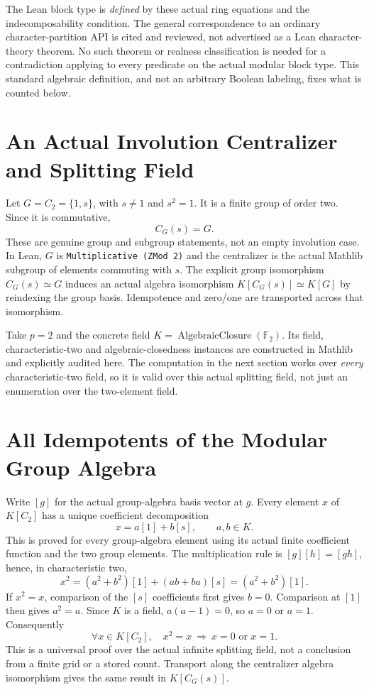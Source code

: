\documentclass[11pt]{article}
\newcommand{\F}{\mathbb F}
\begin{document}
The Lean block type is \emph{defined} by these actual ring equations and
the indecomposability condition. The general correspondence to an ordinary
character-partition API is cited and reviewed, not advertised as a Lean
character-theory theorem. No such theorem or realness classification is
needed for a contradiction applying to every predicate on the actual
modular block type. This standard algebraic definition, and not an
arbitrary Boolean labeling, fixes what is counted below.

\section{An Actual Involution Centralizer and Splitting Field}
Let $G=C_2=\{1,s\}$, with $s\ne1$ and $s^2=1$. It is a finite group
of order two. Since it is commutative,
\[
 C_G(s)=G.
\]
These are genuine group and subgroup statements, not an empty involution
case. In Lean, $G$ is \texttt{Multiplicative (ZMod 2)} and the centralizer
is the actual Mathlib subgroup of elements commuting with $s$.
The explicit group isomorphism $C_G(s)\simeq G$ induces an actual algebra
isomorphism $K[C_G(s)]\simeq K[G]$ by reindexing the group basis.
Idempotence and zero/one are transported across that isomorphism.

Take $p=2$ and the concrete field $K=\operatorname{AlgebraicClosure}(\F_2)$.
Its field, characteristic-two and algebraic-closedness instances are
constructed in Mathlib and explicitly audited here. The computation in
the next section works over \emph{every} characteristic-two field, so it
is valid over this actual splitting field, not just an enumeration over
the two-element field.

\section{All Idempotents of the Modular Group Algebra}
Write $[g]$ for the actual group-algebra basis vector at $g$. Every element
$x$ of $K[C_2]$ has a unique coefficient decomposition
\[
 x=a[1]+b[s],\qquad a,b\in K.
\]
This is proved for every group-algebra element using its actual finite
coefficient function and the two group elements. The multiplication rule
is $[g][h]=[gh]$, hence, in characteristic two,
\[
 x^2=(a^2+b^2)[1]+(ab+ba)[s]=(a^2+b^2)[1].
\]
If $x^2=x$, comparison of the $[s]$ coefficients first gives $b=0$.
Comparison at $[1]$ then gives $a^2=a$. Since $K$ is a field,
$a(a-1)=0$, so $a=0$ or $a=1$. Consequently
\[
 \forall x\in K[C_2],\quad x^2=x\ \Longrightarrow\ x=0\text{ or }x=1.
\]
This is a universal proof over the actual infinite splitting field, not
a conclusion from a finite grid or a stored count. Transport along the
centralizer algebra isomorphism gives the same result in $K[C_G(s)]$.
\end{document}
